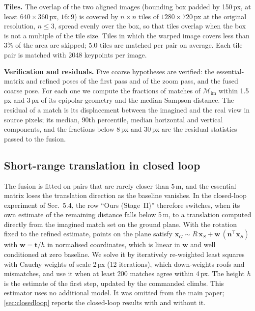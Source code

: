 \documentclass[10pt,twocolumn,letterpaper]{article}
\begin{document}
\noindent\textbf{Tiles.} The overlap of the two aligned images (bounding box padded by 150\,px, at least $640{\times}360$\,px, $16{:}9$) is covered by $n{\times}n$ tiles of $1280{\times}720$\,px at the original resolution, $n\le3$, spread evenly over the box, so that tiles overlap when the box is not a multiple of the tile size. Tiles in which the warped image covers less than 3\% of the area are skipped; 5.0 tiles are matched per pair on average. Each tile pair is matched with 2048 keypoints per image.

\noindent\textbf{Verification and residuals.} Five coarse hypotheses are verified: the essential-matrix and refined poses of the first pass and of the zoom pass, and the fused coarse pose. For each one we compute the fractions of matches of $\mathcal{M}_{\mathrm{im}}$ within 1.5\,px and 3\,px of its epipolar geometry and the median Sampson distance. The residual of a match is its displacement between the imagined and the real view in source pixels; its median, 90th percentile, median horizontal and vertical components, and the fractions below 8\,px and 30\,px are the residual statistics passed to the fusion.

\subsection{Short-range translation in closed loop}
\label{sec:shortrange}

The fusion is fitted on pairs that are rarely closer than 5\,m, and the essential matrix loses the translation direction as the baseline vanishes. In the closed-loop experiment of Sec.~5.4, the row ``Ours (Stage~II)'' therefore switches, when its own estimate of the remaining distance falls below 5\,m, to a translation computed directly from the imagined match set on the ground plane. With the rotation fixed to the refined estimate, points on the plane satisfy $\mathbf{x}_G\sim R\,\mathbf{x}_S+\mathbf{w}\,(\mathbf{n}^{\!\top}\mathbf{x}_S)$ with $\mathbf{w}=\mathbf{t}/h$ in normalised coordinates, which is linear in $\mathbf{w}$ and well conditioned at zero baseline. We solve it by iteratively re-weighted least squares with Cauchy weights of scale 2\,px (12 iterations), which down-weights roofs and mismatches, and use it when at least 200 matches agree within 4\,px. The height $h$ is the estimate of the first step, updated by the commanded climbs. This estimator uses no additional model. It was omitted from the main paper; \cref{sec:closedloop} reports the closed-loop results with and without it.
\end{document}
